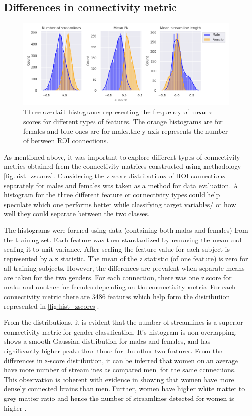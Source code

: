 \documentclass[msthesis.tex]{subfiles}
\begin{document}
\subsection{Differences in connectivity metric}
\label{subsec:connmetric}
\begin{figure}
    \centering
    \includegraphics[width=\textwidth]{images/zscoredist.png}
    \caption{Three overlaid histograms representing the frequency of mean z scores for different types of features. The orange histograms are for females and blue ones are for males.the y axis represents the number of between ROI connections.}
    \label{fig:hist_zscores}
\end{figure} 
As mentioned above, it was important to explore different types of connectivity metrics obtained from the connectivity matrices constructed using methodology \autoref{fig:hist_zscores}. Considering the z score distributions of ROI connections separately for males and females was taken as a method for data evaluation. A histogram for the three different feature or connectivity types could help speculate which one performs better while classifying target variables/ or how well they could separate between the two classes.

The histograms were formed using data (containing both males and females) from the training set. Each feature was then standardized by removing the mean and scaling it to unit variance. After scaling the feature value for each subject is represented by a z statistic. The mean of the z statistic (of one feature) is zero for all training subjects. However, the differences are prevalent when separate means are taken for the two genders. For each connection, there was one z score for males and another for females depending on the connectivity metric. For each connectivity metric there are 3486 features which help form the distribution represented in \autoref{fig:hist_zscores}.

From the distributions, it is evident that the number of streamlines is a superior connectivity metric for gender classification. It's histogram is non-overlapping, shows a smooth Gaussian distribution for males and females, and has significantly higher peaks than those for the other two features. From the differences in z-score distribution, it can be inferred that women on an average have more number of streamlines as compared men, for the same connections. This observation is coherent with evidence in  \cite{szalkai2015graph} showing that women have more densely connected brains than men. Further, women have higher white matter to grey matter ratio and hence the number of streamlines detected for women is higher \cite{taki2011correlations}.
\end{document}
